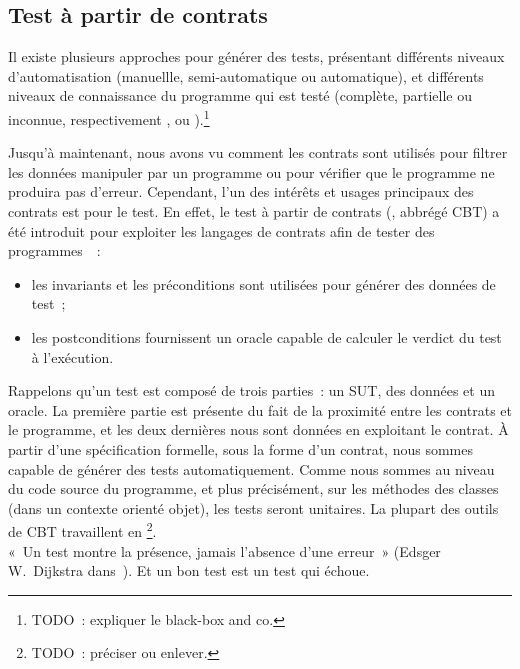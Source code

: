 \subsection{Test à partir de contrats}
\label{subsection:sota:cbt}

Il existe plusieurs approches pour générer des tests, présentant différents
niveaux d'automatisation (manuellle, semi-automatique ou automatique), et
différents niveaux de connaissance du programme qui est testé (complète,
partielle ou inconnue, respectivement ,
 ou ).\footnote{TODO~: expliquer le
black-box and co.}

Jusqu'à maintenant, nous avons vu comment les contrats sont utilisés pour
{\strong filtrer} les données manipuler par un programme ou pour vérifier que le
programme ne produira pas d'erreur. Cependant, l'un des intérêts et usages
principaux des contrats est pour le {\strong test}. En effet, le {\strong test à
partir de contrats} (, abbrégé CBT) a été
introduit pour exploiter les langages de contrats afin de tester des
programmes~~:

\begin{itemize}

\item les invariants et les préconditions sont utilisées pour {\strong générer
des données} de test~;

\item les postconditions {\strong fournissent un oracle} capable de calculer le
verdict du test à l'exécution.

\end{itemize}

Rappelons qu'un test est composé de trois parties~: un SUT, des données et un
oracle. La première partie est présente du fait de la proximité entre les
contrats et le programme, et les deux dernières nous sont données en exploitant
le contrat. À partir d'une spécification formelle, sous la forme d'un contrat,
nous sommes capable de générer des tests automatiquement. Comme nous sommes au
niveau du code source du programme, et plus précisément, sur les méthodes des
classes (dans un contexte orienté objet), les tests seront {\strong unitaires}.
La plupart des outils de CBT travaillent en
\footnote{TODO~: préciser ou enlever.}. \\

«~Un test montre la présence, jamais l'absence d'une erreur~» (Edsger
W.~Dijkstra dans~). Et un bon test est un test qui échoue.

